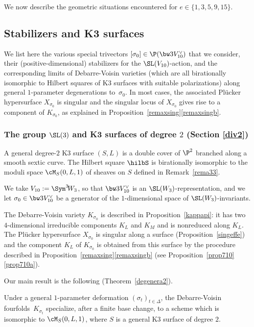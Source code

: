 We now describe the
geometric situations encountered for $e\in\{1,3,5,9,15\}$.

\subsection{Stabilizers and K3 surfaces}\label{sec11}

We list here the various special trivectors $[\sigma_0]\in \P(\bw3V_{10}^\vee)$ that we consider,
their (positive-dimensional) stabilizers for the $\SL(V_{10})$-action, and the corresponding limits of Debarre-Voisin varieties
(which are all birationally isomorphic to Hilbert squares of K3 surfaces with suitable polarizations) along general $1$-parameter degenerations to~$\sigma_0$. In most cases, the associated Plücker hypersurface $X_{\sigma_0}$ is singular and the singular locus of $X_{\sigma_0}$ gives rise to a component of $K_{\sigma_0}$, as explained in Proposition~\ref{remaxsing}\eqref{remaxsingb}.

\subsubsection{The group $\SL(3)$ and K3 surfaces of degree $2$ (Section \ref{div2})} \label{s111}

A general degree\nobreakdash-$2$ K3 surface $(S,L)$ is a double cover of $ \P^2$ branched along a smooth sextic curve. The Hilbert square $\hilbS $ is birationally isomorphic to the moduli space $\cM_S(0,L,1)$ of sheaves on $S$ defined in Remark~\ref{rema33}.

We take $V_{10}:=\Sym^3 \!W_3$, so that $\bw3 V^{\vee}_{10}$ is an $\SL(W_3)$-representation, and we let $\sigma_0\in \bw3 V^{\vee}_{10}$ be a generator of the $1$-dimensional space of
$\SL(W_3)$-invariants.

The Debarre-Voisin variety $K_{\sigma_0}$ is described in Proposition~\ref{kappapi}: it has two $4$-dimen\-sional irreducible components $K_L$ and $K_M$ and is nonreduced along $K_L$. The Plücker hypersurface $X_{\sigma_0}$ is singular along a surface (Proposition~\ref{singeffe}) and the
component $K_L$ of $K_{\sigma_0}$ is obtained from this surface by the procedure described in Proposition~\ref{remaxsing}\eqref{remaxsingb} (see Proposition~\ref{prop710}\eqref{prop710a}).

Our main result is the following (Theorem~\ref{degenera2}).

{
\begin{theo} \label{theodue}
Under a general $1$-parameter deformation
$(\sigma_t)_{t\in \Delta}$, the Debarre-Voisin fourfolds~$K_{\sigma_t}$ specialize, after a finite base change, to a scheme which is isomorphic
to $\cM_S(0,L,1)$, where $S$ is a general K3 surface of degree $2$.
\end{theo}}

